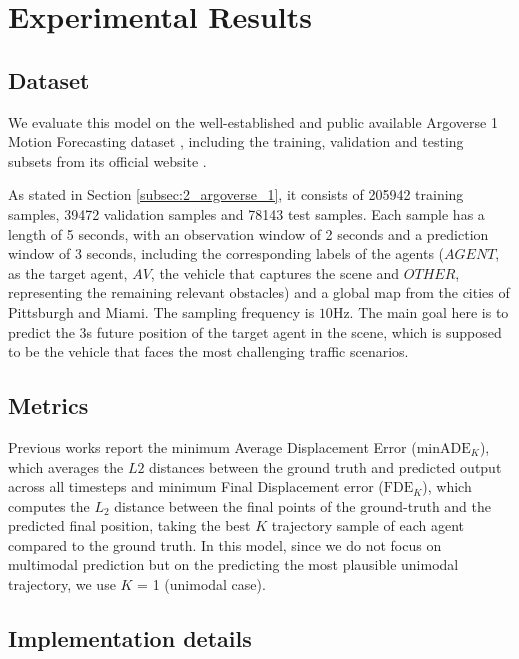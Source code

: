 \section{Experimental Results}
\label{sec:5_experimental_results}

\subsection{Dataset}
\label{subsec:5_dataset}

We evaluate this model on the well-established and public available Argoverse 1 Motion Forecasting dataset \cite{chang2019argoverse}, including the training, validation and testing subsets from its official website \cite{argobench}. 

As stated in Section \ref{subsec:2_argoverse_1}, it consists of 205942 training samples, 39472 validation samples and 78143 test samples. Each sample has a length of 5 seconds, with an observation window of 2 seconds and a prediction window of 3 seconds, including the corresponding labels of the agents ($AGENT$, as the target agent, $AV$, the vehicle that captures the scene and $OTHER$, representing the remaining relevant obstacles) and a global map from the cities of Pittsburgh and Miami. The sampling frequency is $10\mathrm{Hz}$. The main goal here is to predict the 3s future position of the target agent in the scene, which is supposed to be the vehicle that faces the most challenging traffic scenarios.

\subsection{Metrics}
\label{subsec:5_metrics}

Previous works \cite{chai2019multipath, mercat2020multi, sadeghian2019sophie} report the minimum Average Displacement Error ($\text{minADE}_K$), which averages the $L2$ distances between the ground truth and predicted output across all timesteps and minimum Final Displacement error ($\text{FDE}_K$), which computes the $L_{2}$ distance between the final points of the ground-truth and the predicted final position, taking the best $K$ trajectory sample of each agent compared to the ground truth. In this model, since we do not focus on multimodal prediction but on the predicting the most plausible unimodal trajectory, we use $K$ = 1 (unimodal case).

\subsection{Implementation details}
\label{subsec:5_implementation_details}

